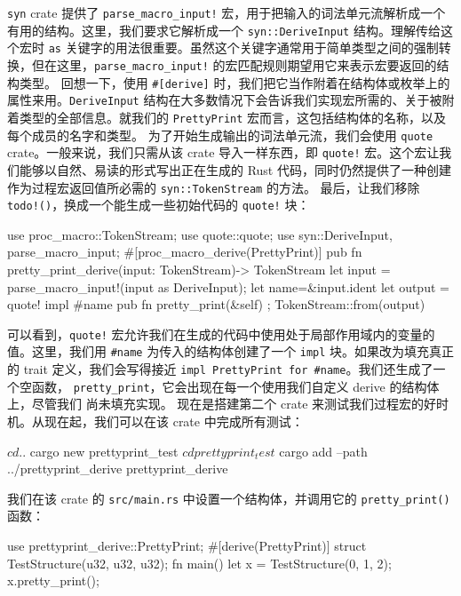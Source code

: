 \texttt{syn} crate 提供了 \texttt{parse\_\allowbreak{}macro\_\allowbreak{}input!} 宏，用于把输入的词法单元流解析成一个有用的结构。这里，我们要求它解析成一个 \texttt{syn::\allowbreak{}DeriveInput} 结构。理解传给这个宏时 \texttt{as} 关键字的用法很重要。虽然这个关键字通常用于简单类型之间的强制转换，但在这里，\texttt{parse\_\allowbreak{}macro\_\allowbreak{}input!} 的宏匹配规则期望用它来表示宏要返回的结构类型。
\label{idx:idx_4b4060ca}
回想一下，使用 \texttt{\#[derive]} 时，我们把它当作附着在结构体或枚举上的属性来用。\texttt{DeriveInput} 结构在大多数情况下会告诉我们实现宏所需的、关于被附着类型的全部信息。就我们的 \texttt{PrettyPrint} 宏而言，这包括结构体的名称，以及每个成员的名字和类型。
为了开始生成输出的词法单元流，我们会使用 \texttt{quote} crate。一般来说，我们只需从该 crate 导入一样东西，即 \texttt{quote!} 宏。这个宏让我们能够以自然、易读的形式写出正在生成的 Rust 代码，同时仍然提供了一种创建
作为过程宏返回值所必需的 \texttt{syn::\allowbreak{}TokenStream} 的方法。
最后，让我们移除 \texttt{todo!()}，换成一个能生成一些初始代码的 \texttt{quote!} 块：
\begin{codebox}[rust]
use proc_macro::TokenStream;
use quote::quote;
use syn::{DeriveInput, parse_macro_input};
#[proc_macro_derive(PrettyPrint)]
pub fn pretty_print_derive(input: TokenStream)-> TokenStream {
    let input = parse_macro_input!(input as DeriveInput);
    let name=&input.ident
    let output = quote! {
        impl #name {
            pub fn pretty_print(&self) {
            }
        }
    };
    TokenStream::from(output)
}
\end{codebox}
\label{idx:idx_d68a152f}
可以看到，\texttt{quote!} 宏允许我们在生成的代码中使用处于局部作用域内的变量的值。这里，我们用 \texttt{\#name} 为传入的结构体创建了一个 \texttt{impl} 块。如果改为填充真正的 trait 定义，我们会写得接近 \texttt{impl PrettyPrint for \#name}。我们还生成了一个空函数，
\texttt{pretty\_\allowbreak{}print}，它会出现在每一个使用我们自定义 derive 的结构体上，尽管我们
尚未填充实现。
现在是搭建第二个 crate 来测试我们过程宏的好时机。从现在起，我们可以在该 crate 中完成所有测试：
\begin{codeboxdark}
$ cd ..
$ cargo new prettyprint_test
$ cd prettyprint_test
$ cargo add --path ../prettyprint_derive prettyprint_derive
\end{codeboxdark}
我们在该 crate 的 \texttt{src/main.rs} 中设置一个结构体，并调用它的 \texttt{pretty\_\allowbreak{}print(\allowbreak{})\allowbreak{}} 函数：
\begin{codebox}[rust]
use prettyprint_derive::PrettyPrint;
#[derive(PrettyPrint)]
struct TestStructure(u32, u32, u32);
fn main() {
    let x = TestStructure(0, 1, 2);
    x.pretty_print();
}
\end{codebox}
